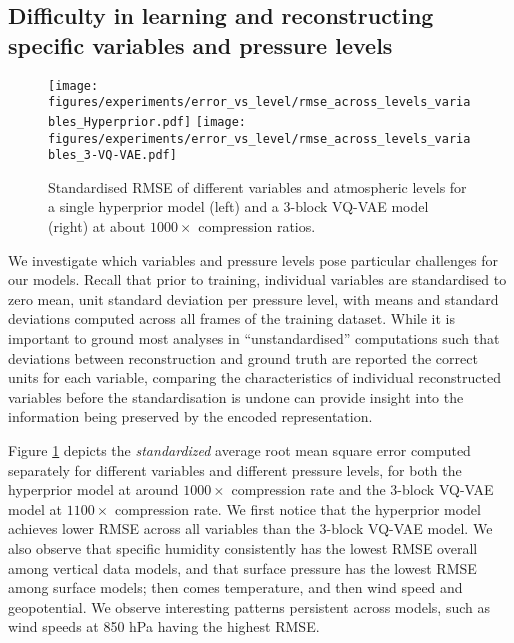 \subsection{Difficulty in learning and reconstructing specific variables and pressure levels}
\label{sx:discuss:limitation-artefacts}

\begin{figure}
    \centering
    \texttt{[image: figures/experiments/error\_vs\_level/rmse\_across\_levels\_variables\_Hyperprior.pdf]}
    \texttt{[image: figures/experiments/error\_vs\_level/rmse\_across\_levels\_variables\_3-VQ-VAE.pdf]}
    \hfill
    \caption{Standardised RMSE of different variables and atmospheric levels for a single hyperprior model (left) and a 3-block VQ-VAE model (right) at about $1000\times$ compression ratios.}
    \label{fig:rmse_comparison_variables}
\end{figure}

We investigate which variables and pressure levels pose particular challenges for our models.
Recall that prior to training, individual variables are standardised to zero mean, unit standard deviation per pressure level, with means and standard deviations computed across all frames of the training dataset.
While it is important to ground most analyses in ``unstandardised'' computations such that deviations between reconstruction and ground truth are reported the correct units for each variable, comparing the characteristics of individual reconstructed variables before the standardisation is undone can provide insight into the information being preserved by the encoded representation.

Figure \ref{fig:rmse_comparison_variables} depicts the \emph{standardized} average root mean square error computed separately for different variables and different pressure levels, for both the hyperprior model at around $1000\times$ compression rate and the 3-block VQ-VAE model at $1100\times$ compression rate. We first notice that the hyperprior model achieves lower RMSE across all variables than the 3-block VQ-VAE model. We also observe that specific humidity consistently has the lowest RMSE overall among vertical data models, and that surface pressure has the lowest RMSE among surface models; then comes temperature, and then wind speed and geopotential. We observe interesting patterns persistent across models, such as wind speeds at 850 hPa having the highest RMSE.

